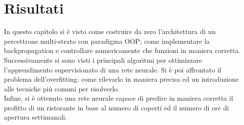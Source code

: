 
\newpage
\section{Risultati}
In questo capitolo si è visto come costruire da zero l'architettura di un percettrone multi-strato con paradigma OOP; come implementare la backpropagation e controllare numericamente che funzioni in maniera corretta. Successivamente si sono visti i principali algoritmi per ottimizzare l'apprendimento supervisionato di una rete neurale. Si è poi affrontato il problema dell'overfitting: come rilevarlo in maniera precisa ed un introduzione alle tecniche più comuni per risolverlo. \\
Infine, si è ottenuto una rete neurale capace di predire in maniera corretta il profitto di un ristorante in base al numero di coperti ed il numero di ore di apertura settimanali. 